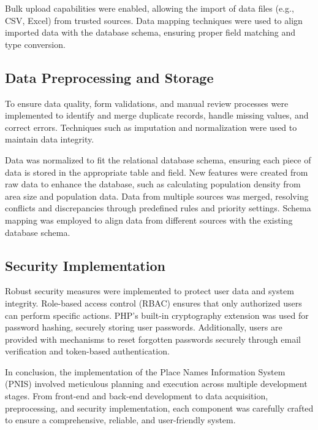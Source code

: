 Bulk upload capabilities were enabled, allowing the import of data files (e.g., CSV, Excel) from trusted sources. Data mapping techniques were used to align imported data with the database schema, ensuring proper field matching and type conversion.

\subsection{Data Preprocessing and Storage}
To ensure data quality, form validations, and manual review processes were implemented to identify and merge duplicate records, handle missing values, and correct errors. Techniques such as imputation and normalization were used to maintain data integrity.

Data was normalized to fit the relational database schema, ensuring each piece of data is stored in the appropriate table and field. New features were created from raw data to enhance the database, such as calculating population density from area size and population data. Data from multiple sources was merged, resolving conflicts and discrepancies through predefined rules and priority settings. Schema mapping was employed to align data from different sources with the existing database schema.

\subsection{Security Implementation}
Robust security measures were implemented to protect user data and system integrity. Role-based access control (RBAC) ensures that only authorized users can perform specific actions. PHP's built-in cryptography extension was used for password hashing, securely storing user passwords. Additionally, users are provided with mechanisms to reset forgotten passwords securely through email verification and token-based authentication.

In conclusion, the implementation of the Place Names Information System (PNIS) involved meticulous planning and execution across multiple development stages. From front-end and back-end development to data acquisition, preprocessing, and security implementation, each component was carefully crafted to ensure a comprehensive, reliable, and user-friendly system.